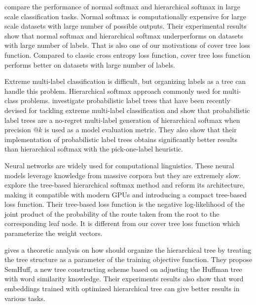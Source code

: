 \documentclass[10pt]{article}
\theoremstyle{definition}
\begin{document}
\cite{Mohammed2018EffectivenessOH} compare the performance of normal softmax and hierarchical softmax in large scale classification tasks. 
Normal softmax is computationally expensive for large scale datasets with large number of possible outputs.
Their experimental results show that normal softmax and hierarchical softmax underperforms on datasets with large number of labels.
That is also one of our motivations of cover tree loss function. 
Compared to classic cross entropy loss function, cover tree loss function performs better on datasets with large number of labels.

Extreme multi-label classification is difficult, but organizing labels as a tree can handle this problem. 
Hierarchical softmax approach commonly used for multi-class problems.
\cite{Wydmuch2018ANG} investigate probabilistic label trees that have been recently devised for tackling extreme multi-label classification and show that probabilistic label trees are a no-regret multi-label generation of hierarchical softmax when precision $@k$ is used as a model evaluation metric.
They also show that their implementation of probabilistic label trees obtains significantly better results than hierarchical softmax with the pick-one-label heuristic.

Neural networks are widely used for computational linguistics.
These neural models leverage knowledge from massive corpora but they are extremely slow.
\cite{Jiang2017ExplorationOT} explore the tree-based hierarchical softmax method and reform its architecture, making it compatible
with modern GPUs and introducing a compact tree-based loss function.
Their tree-based loss function is the negative log-likelihood of the joint product of the probability of the route taken from the root to the corresponding leaf node. 
It is different from our cover tree loss function which parameterize the weight vectors. 

\cite{Yang2017OptimizeHS} gives a theoretic analysis on how should organize the hierarchical tree by treating the tree structure as a parameter of the training objective function.
They propose SemHuff, a new tree constructing scheme based on adjusting the Huffman tree with word similarity knowledge.
Their experiments results also show that word embeddings trained with optimized hierarchical tree can give better results in various tasks.

\end{document}
